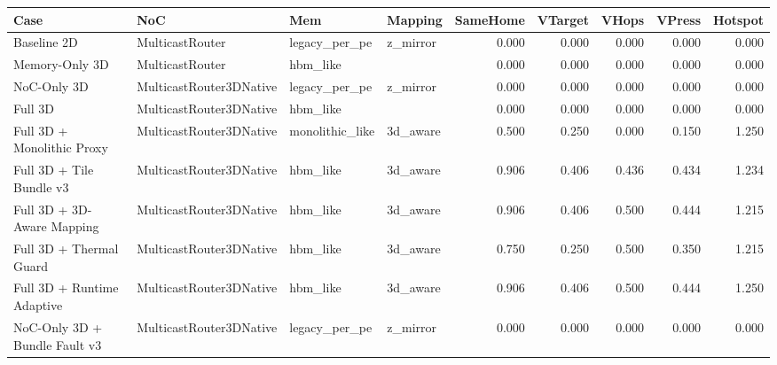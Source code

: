 \begin{tabular}{l l l l r r r r r}
\hline
Case & NoC & Mem & Mapping & SameHome & VTarget & VHops & VPress & Hotspot \\
\hline
Baseline 2D & MulticastRouter & legacy\_per\_pe & z\_mirror & 0.000 & 0.000 & 0.000 & 0.000 & 0.000 \\
Memory-Only 3D & MulticastRouter & hbm\_like &  & 0.000 & 0.000 & 0.000 & 0.000 & 0.000 \\
NoC-Only 3D & MulticastRouter3DNative & legacy\_per\_pe & z\_mirror & 0.000 & 0.000 & 0.000 & 0.000 & 0.000 \\
Full 3D & MulticastRouter3DNative & hbm\_like &  & 0.000 & 0.000 & 0.000 & 0.000 & 0.000 \\
Full 3D + Monolithic Proxy & MulticastRouter3DNative & monolithic\_like & 3d\_aware & 0.500 & 0.250 & 0.000 & 0.150 & 1.250 \\
Full 3D + Tile Bundle v3 & MulticastRouter3DNative & hbm\_like & 3d\_aware & 0.906 & 0.406 & 0.436 & 0.434 & 1.234 \\
Full 3D + 3D-Aware Mapping & MulticastRouter3DNative & hbm\_like & 3d\_aware & 0.906 & 0.406 & 0.500 & 0.444 & 1.215 \\
Full 3D + Thermal Guard & MulticastRouter3DNative & hbm\_like & 3d\_aware & 0.750 & 0.250 & 0.500 & 0.350 & 1.215 \\
Full 3D + Runtime Adaptive & MulticastRouter3DNative & hbm\_like & 3d\_aware & 0.906 & 0.406 & 0.500 & 0.444 & 1.250 \\
NoC-Only 3D + Bundle Fault v3 & MulticastRouter3DNative & legacy\_per\_pe & z\_mirror & 0.000 & 0.000 & 0.000 & 0.000 & 0.000 \\
\hline
\end{tabular}
